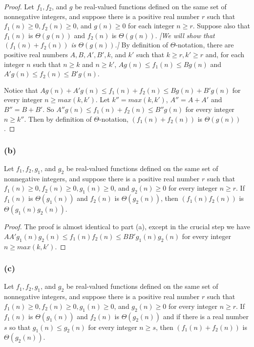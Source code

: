 \documentclass[14pt]{extarticle}
\begin{document}
\begin{proof}
    Let \(f_1, f_2\), and \(g\) be real-valued functions defined on the same set of nonnegative integers, and suppose there is
    a positive real number \(r\) such that \(f_1(n) \geq 0, f_2(n) \geq 0\), and \(g(n) \geq 0\) for each integer \(n \geq r\).
    Suppose also that \(f_1(n)\) is \(\Theta(g(n))\) and \(f_2(n)\) is \(\Theta(g(n))\). {\it [We will show that \((f_1(n) +
                f_2(n))\) is \(\Theta(g(n))\).]} By definition of \(\Theta\)-notation, there are positive real numbers \(A, B, A', B', k\),
    and \(k'\) such that \(k \geq r, k' \geq r\) and, for each integer \(n\) such that \(n \geq k\) and \(n \geq k'\),
    \(Ag(n) \leq f_1(n) \leq Bg(n)\) and \(A'g(n) \leq f_2(n) \leq B'g(n)\).

    Notice that \(Ag(n) + A'g(n) \leq f_1(n) + f_2(n) \leq Bg(n) + B'g(n)\) for every integer \(n \geq max(k, k')\). Let
    \(k'' = max(k, k')\), \(A'' = A + A'\) and \(B'' = B + B'\). So \(A''g(n) \leq f_1(n) + f_2(n) \leq B''g(n)\) for every
    integer \(n \geq k''\). Then by definition of \(\Theta\)-notation, \((f_1(n) + f_2(n))\) is \(\Theta(g(n))\).
\end{proof}

\subsubsection{(b)}
Let \(f_1, f_2, g_1\), and \(g_2\) be real-valued functions defined on the same set of nonnegative integers, and suppose
there is a positive real number \(r\) such that \(f_1(n) \geq 0, f_2(n) \geq 0, g_1(n) \geq 0\), and \(g_2(n) \geq 0\) for
every integer \(n \geq r\). If \(f_1(n)\) is \(\Theta(g_1(n))\) and \(f_2(n)\) is \(\Theta(g_2(n))\), then
\((f_1(n)f_2(n))\) is \(\Theta(g_1(n)g_2(n))\).

\begin{proof}
    The proof is almost identical to part (a), except in the crucial step we have \(AA'g_1(n)g_2(n) \leq f_1(n)f_2(n) \leq
    BB'g_1(n)g_2(n)\) for every integer \(n \geq max(k, k')\).
\end{proof}

\subsubsection{(c)}
Let \(f_1, f_2, g_1\), and \(g_2\) be real-valued functions defined on the same set of nonnegative integers, and suppose
there is a positive real number \(r\) such that \(f_1(n) \geq 0, f_2(n) \geq 0, g_1(n) \geq 0\), and \(g_2(n) \geq 0\) for
every integer \(n \geq r\). If \(f_1(n)\) is \(\Theta(g_1(n))\) and \(f_2(n)\) is \(\Theta(g_2(n))\) and if there is a real
number \(s\) so that \(g_1(n) \leq g_2(n)\) for every integer \(n \geq s\), then \((f_1(n)+f_2(n))\) is \(\Theta(g_2(n))\).
\end{document}
